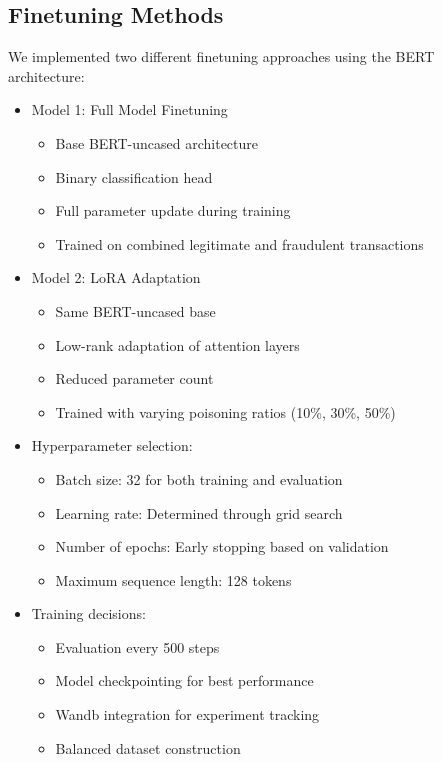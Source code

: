 \documentclass{article}
\begin{document}
\subsection{Finetuning Methods}
We implemented two different finetuning approaches using the BERT architecture:

\begin{itemize}
    \item Model 1: Full Model Finetuning
    \begin{itemize}
        \item Base BERT-uncased architecture
        \item Binary classification head
        \item Full parameter update during training
        \item Trained on combined legitimate and fraudulent transactions
    \end{itemize}

    \item Model 2: LoRA Adaptation
    \begin{itemize}
        \item Same BERT-uncased base
        \item Low-rank adaptation of attention layers
        \item Reduced parameter count
        \item Trained with varying poisoning ratios (10\%, 30\%, 50\%)
    \end{itemize}

    \item Hyperparameter selection:
    \begin{itemize}
        \item Batch size: 32 for both training and evaluation
        \item Learning rate: Determined through grid search
        \item Number of epochs: Early stopping based on validation
        \item Maximum sequence length: 128 tokens
    \end{itemize}

    \item Training decisions:
    \begin{itemize}
        \item Evaluation every 500 steps
        \item Model checkpointing for best performance
        \item Wandb integration for experiment tracking
        \item Balanced dataset construction
    \end{itemize}
\end{itemize}
\end{document}
